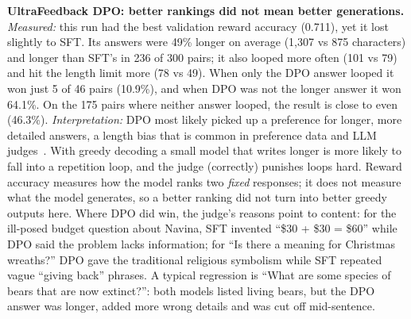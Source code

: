 \documentclass[10pt]{article}
\begin{document}
\textbf{UltraFeedback DPO: better rankings did not mean better generations.} \emph{Measured:} this run had the best validation reward accuracy (0.711), yet it lost slightly to SFT. Its answers were 49\% longer on average (1,307 vs 875 characters) and longer than SFT's in 236 of 300 pairs; it also looped more often (101 vs 79) and hit the length limit more (78 vs 49). When only the DPO answer looped it won just 5 of 46 pairs (10.9\%), and when DPO was not the longer answer it won 64.1\%. On the 175 pairs where neither answer looped, the result is close to even (46.3\%). \emph{Interpretation:} DPO most likely picked up a preference for longer, more detailed answers, a length bias that is common in preference data and LLM judges~\cite{dubois2024}. With greedy decoding a small model that writes longer is more likely to fall into a repetition loop, and the judge (correctly) punishes loops hard. Reward accuracy measures how the model ranks two \emph{fixed} responses; it does not measure what the model generates, so a better ranking did not turn into better greedy outputs here. Where DPO did win, the judge's reasons point to content: for the ill-posed budget question about Navina, SFT invented ``\$30 + \$30 = \$60'' while DPO said the problem lacks information; for ``Is there a meaning for Christmas wreaths?'' DPO gave the traditional religious symbolism while SFT repeated vague ``giving back'' phrases. A typical regression is ``What are some species of bears that are now extinct?'': both models listed living bears, but the DPO answer was longer, added more wrong details and was cut off mid-sentence.
\end{document}
